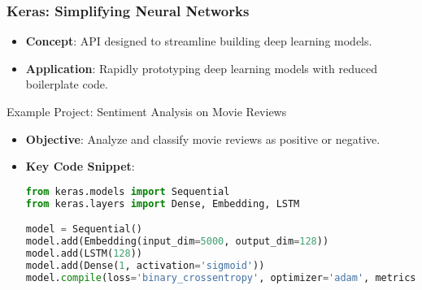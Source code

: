 \documentclass{beamer}
\begin{document}
\begin{frame}
    \frametitle{Keras: Simplifying Neural Networks}
    \begin{itemize}
        \item \textbf{Concept}: API designed to streamline building deep learning models.
        \item \textbf{Application}: Rapidly prototyping deep learning models with reduced boilerplate code.
    \end{itemize}

    \begin{block}{Example Project: Sentiment Analysis on Movie Reviews}
        \begin{itemize}
            \item \textbf{Objective}: Analyze and classify movie reviews as positive or negative.
            \item \textbf{Key Code Snippet}:
            \begin{lstlisting}[language=Python]
from keras.models import Sequential
from keras.layers import Dense, Embedding, LSTM

model = Sequential()
model.add(Embedding(input_dim=5000, output_dim=128))
model.add(LSTM(128))
model.add(Dense(1, activation='sigmoid'))
model.compile(loss='binary_crossentropy', optimizer='adam', metrics=['accuracy'])
            \end{lstlisting}
        \end{itemize}
    \end{block}
\end{frame}
\end{document}
